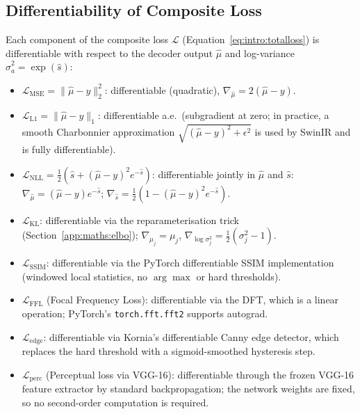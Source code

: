 \documentclass[12pt, a4paper, twoside, openright]{book}
\begin{document}
\begin{appendices}
\section{Differentiability of Composite Loss}
\label{app:maths:grad}

Each component of the composite loss $\mathcal{L}$ (Equation~\ref{eq:intro:totalloss}) is differentiable with respect to the decoder output $\hat{\mu}$ and log-variance $\hat{\sigma}_a^2 = \exp(\hat{s})$:

\begin{itemize}
  \item $\mathcal{L}_{\mathrm{MSE}} = \|\hat{\mu} - y\|_2^2$: differentiable (quadratic), $\nabla_{\hat{\mu}} = 2(\hat{\mu}-y)$.

  \item $\mathcal{L}_{\mathrm{L1}} = \|\hat{\mu} - y\|_1$: differentiable a.e.\ (subgradient at zero; in practice, a smooth Charbonnier approximation $\sqrt{(\hat{\mu}-y)^2 + \epsilon^2}$ is used by SwinIR and is fully differentiable).

  \item $\mathcal{L}_{\mathrm{NLL}} = \frac{1}{2}\!\left(\hat{s} + (\hat{\mu}-y)^2 e^{-\hat{s}}\right)$: differentiable jointly in $\hat{\mu}$ and $\hat{s}$:
    $\nabla_{\hat{\mu}} = (\hat{\mu}-y)e^{-\hat{s}}$;
    $\nabla_{\hat{s}} = \frac{1}{2}\left(1 - (\hat{\mu}-y)^2 e^{-\hat{s}}\right)$.

  \item $\mathcal{L}_{\mathrm{KL}}$: differentiable via the reparameterisation trick (Section~\ref{app:maths:elbo}); $\nabla_{\mu_j} = \mu_j$, $\nabla_{\log\sigma_j^2} = \frac{1}{2}(\sigma_j^2 - 1)$.

  \item $\mathcal{L}_{\mathrm{SSIM}}$: differentiable via the PyTorch differentiable SSIM implementation (windowed local statistics, no $\arg\max$ or hard thresholds).

  \item $\mathcal{L}_{\mathrm{FFL}}$ (Focal Frequency Loss): differentiable via the DFT, which is a linear operation; PyTorch's \texttt{torch.fft.fft2} supports autograd.

  \item $\mathcal{L}_{\mathrm{edge}}$: differentiable via Kornia's differentiable Canny edge detector, which replaces the hard threshold with a sigmoid-smoothed hysteresis step.

  \item $\mathcal{L}_{\mathrm{perc}}$ (Perceptual loss via VGG-16): differentiable through the frozen VGG-16 feature extractor by standard backpropagation; the network weights are fixed, so no second-order computation is required.
\end{itemize}


\end{appendices}
\end{document}
